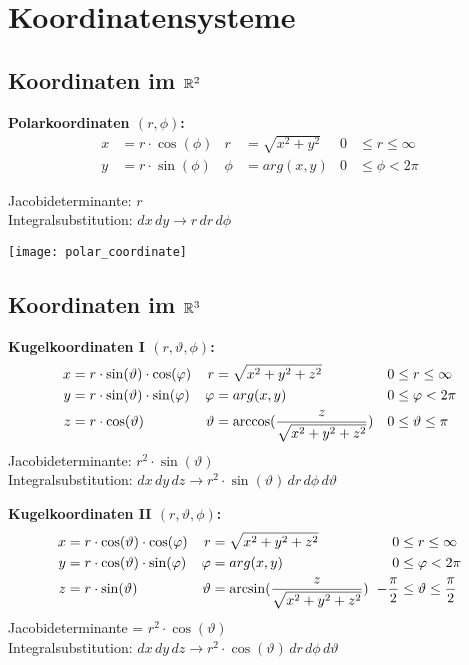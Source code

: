 \section{Koordinatensysteme}
\vspace{-0.1cm}\subsection{Koordinaten im $\R^2$}
\textbf{Polarkoordinaten $(r, \phi)$:}\\
\begin{align*}
	x &= r \cdot \cos(\phi) &  r &= \sqrt{x^2 + y^2} & 0 &\leq r \leq \infty\\
	y &= r \cdot \sin(\phi) &  \phi &= arg(x, y) & 0 &\leq \phi < 2\pi
\end{align*}

\begin{minipage}{0.6\columnwidth}
	Jacobideterminante: $r$\\
	Integralsubstitution: $dx \, dy \to r \, dr \, d\phi$
\end{minipage}
\begin{minipage}{0.39\columnwidth}
	\texttt{[image: polar\_coordinate]}
\end{minipage}

\vspace{-0.3cm}\subsection{Koordinaten im $\R^3$}
\textbf{Kugelkoordinaten I $(r, \vartheta, \phi)$:}\\
\begin{align*}
	x &= r \cdot \sin(\vartheta) \cdot \cos(\phi) & r &= \sqrt{x^2 + y^2 + z^2} & 0 &\leq r \leq \infty\\
	y &= r \cdot \sin(\vartheta) \cdot \sin(\phi) & \phi &= arg(x, y) & 0 &\leq \phi < 2\pi\\
	z &= r \cdot \cos(\vartheta) & \vartheta &= \arccos({\small \frac{z}{\sqrt{x^2 + y^2 + z^2}}}) & 0 &\leq \vartheta \leq \pi
\end{align*}
Jacobideterminante: $r^2 \cdot \sin(\vartheta)$\\
Integralsubstitution: $dx \, dy\, dz \to r^2 \cdot \sin(\vartheta) \, dr \, d\phi \, d\vartheta$

\textbf{Kugelkoordinaten II $(r, \vartheta, \phi)$:}\\
\begin{align*}
	x &= r \cdot \cos(\vartheta) \cdot \cos(\phi) & r &= \sqrt{x^2 + y^2 + z^2} & 0 &\leq r \leq \infty\\
	y &= r \cdot \cos(\vartheta) \cdot \sin(\phi) & \phi &= arg(x, y) & 0 &\leq \phi < 2\pi\\
	z &= r \cdot \sin(\vartheta) & \vartheta &= \arcsin({\small \frac{z}{\sqrt{x^2 + y^2 + z^2}}}) &\hspace{-0.15cm}-\frac{\pi}{2} &\leq \vartheta \leq \frac{\pi}{2}
\end{align*}
Jacobideterminante = $r^2 \cdot \cos(\vartheta)$\\
Integralsubstitution: $dx \, dy\, dz \to r^2 \cdot \cos(\vartheta) \, dr \, d\phi \, d\vartheta$

